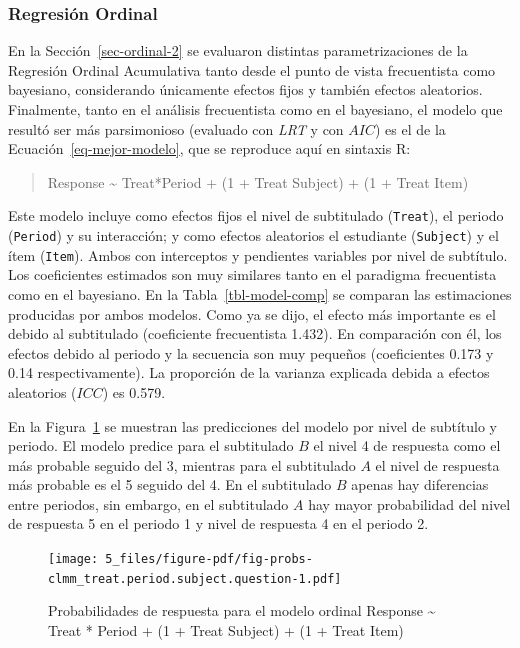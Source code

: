 \documentclass[
  12pt,
  a4paper,
  extrafontsizes,
  onecolumn,
  openright,
  table]{memoir}
\begin{document}
\hypertarget{sec-ordinal-3}{%
\subsubsection{Regresión Ordinal}\label{sec-ordinal-3}}

En la Sección~\ref{sec-ordinal-2} se evaluaron distintas
parametrizaciones de la Regresión Ordinal Acumulativa tanto desde el
punto de vista frecuentista como bayesiano, considerando únicamente
efectos fijos y también efectos aleatorios. Finalmente, tanto en el
análisis frecuentista como en el bayesiano, el modelo que resultó ser
más parsimonioso (evaluado con \emph{\gls{LRT}} y con \(AIC\)) es el de
la Ecuación~\ref{eq-mejor-modelo}, que se reproduce aquí en sintaxis R:

\small

\begin{quote}
Response \textasciitilde{} Treat*Period + (1 + Treat \textbar{} Subject)
+ (1 + Treat \textbar{} Item)
\end{quote}

\normalsize

Este modelo incluye como efectos fijos el nivel de subtitulado
(\texttt{Treat}), el periodo (\texttt{Period}) y su interacción; y como
efectos aleatorios el estudiante (\texttt{Subject}) y el ítem
(\texttt{Item}). Ambos con interceptos y pendientes variables por nivel
de subtítulo. Los coeficientes estimados son muy similares tanto en el
paradigma frecuentista como en el bayesiano. En la
Tabla~\ref{tbl-model-comp} se comparan las estimaciones producidas por
ambos modelos. Como ya se dijo, el efecto más importante es el debido al
subtitulado (coeficiente frecuentista 1.432). En comparación con él, los
efectos debido al periodo y la secuencia son muy pequeños (coeficientes
0.173 y 0.14 respectivamente). La proporción de la varianza explicada
debida a efectos aleatorios (\(ICC\)) es 0.579.

En la Figura~\ref{fig-probs-clmm_treat.period.subject.question} se
muestran las predicciones del modelo por nivel de subtítulo y periodo.
El modelo predice para el subtitulado \(B\) el nivel 4 de respuesta como
el más probable seguido del 3, mientras para el subtitulado \(A\) el
nivel de respuesta más probable es el 5 seguido del 4. En el subtitulado
\(B\) apenas hay diferencias entre periodos, sin embargo, en el
subtitulado \(A\) hay mayor probabilidad del nivel de respuesta 5 en el
periodo 1 y nivel de respuesta 4 en el periodo 2.

\begin{figure}[h]

{\centering \texttt{[image: 5\_files/figure-pdf/fig-probs-clmm\_treat.period.subject.question-1.pdf]}

}

\caption[Probabilidades de respuesta para el modelo ordinal
seleccionado.]{\label{fig-probs-clmm_treat.period.subject.question}Probabilidades
de respuesta para el modelo ordinal Response \textasciitilde{} Treat *
Period + (1 + Treat \textbar{} Subject) + (1 + Treat \textbar{} Item)}

\end{figure}
\end{document}
